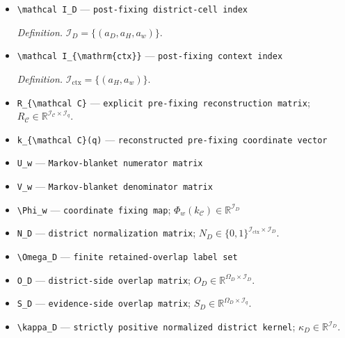 \documentclass{article}
\begin{document}
\begin{itemize}
  \par\smallskip\noindent\emph{Definition.} \(\mathcal I_{\mathcal C}=\{(a_D,a_w,a_H)\}\).
  \item \texttt{\textbackslash{}\allowbreak{}mathcal I\_\allowbreak{}D} --- \texttt{post-\allowbreak{}fixing district-\allowbreak{}cell index}
  \par\smallskip\noindent\emph{Definition.} \(\mathcal I_D=\{(a_D,a_H,a_w)\}\).
  \item \texttt{\textbackslash{}\allowbreak{}mathcal I\_\allowbreak{}\{\textbackslash{}\allowbreak{}mathrm\{ctx\}\allowbreak{}\}\allowbreak{}} --- \texttt{post-\allowbreak{}fixing context index}
  \par\smallskip\noindent\emph{Definition.} \(\mathcal I_{\mathrm{ctx}}=\{(a_H,a_w)\}\).
  \item \texttt{R\_\allowbreak{}\{\textbackslash{}\allowbreak{}mathcal C\}\allowbreak{}} --- \texttt{explicit pre-\allowbreak{}fixing reconstruction matrix}; \(R_{\mathcal C}\in\mathbb R^{\mathcal I_{\mathcal C}\times\mathcal I_q}\).
  \item \texttt{k\_\allowbreak{}\{\textbackslash{}\allowbreak{}mathcal C\}\allowbreak{}(q)} --- \texttt{reconstructed pre-\allowbreak{}fixing coordinate vector}
  \item \texttt{U\_\allowbreak{}w} --- \texttt{Markov-\allowbreak{}blanket numerator matrix}
  \item \texttt{V\_\allowbreak{}w} --- \texttt{Markov-\allowbreak{}blanket denominator matrix}
  \item \texttt{\textbackslash{}\allowbreak{}Phi\_\allowbreak{}w} --- \texttt{coordinate fixing map}; \(\Phi_w(k_{\mathcal C})\in\mathbb R^{\mathcal I_D}\)
  \item \texttt{N\_\allowbreak{}D} --- \texttt{district normalization matrix}; \(N_D\in\{0,1\}^{\mathcal I_{\mathrm{ctx}}\times\mathcal I_D}\).
  \item \texttt{\textbackslash{}\allowbreak{}Omega\_\allowbreak{}D} --- \texttt{finite retained-\allowbreak{}overlap label set}
  \item \texttt{O\_\allowbreak{}D} --- \texttt{district-\allowbreak{}side overlap matrix}; \(O_D\in\mathbb R^{\Omega_D\times\mathcal I_D}\).
  \item \texttt{S\_\allowbreak{}D} --- \texttt{evidence-\allowbreak{}side overlap matrix}; \(S_D\in\mathbb R^{\Omega_D\times\mathcal I_q}\).
  \item \texttt{\textbackslash{}\allowbreak{}kappa\_\allowbreak{}D} --- \texttt{strictly positive normalized district kernel}; \(\kappa_D\in\mathbb R^{\mathcal I_D}\).

\end{itemize}
\end{document}
